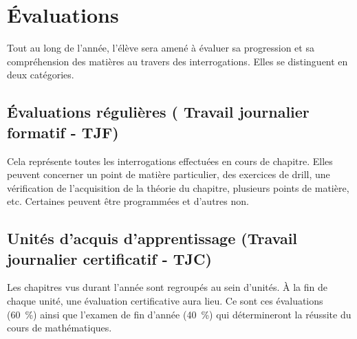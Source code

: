 \documentclass[parskip=half-, numbers=enddot, DIV=15]{scrartcl}
\begin{document}
\section{Évaluations}

Tout au long de l'année, l'élève sera amené à évaluer sa progression et
sa compréhension des matières au travers des interrogations. Elles se
distinguent en deux catégories.

\subsection{Évaluations régulières ( Travail journalier formatif - TJF)}

Cela représente toutes les interrogations effectuées en cours de
chapitre. Elles peuvent concerner un point de matière particulier, des
exercices de drill, une vérification de l'acquisition de la théorie du chapitre, plusieurs points de matière, etc. Certaines peuvent être
programmées et d'autres non.

\subsection{Unités d'acquis d'apprentissage (Travail journalier certificatif - TJC)}

Les chapitres vus durant l'année sont regroupés au sein d'unités. À la fin de chaque unité, une évaluation certificative aura lieu. Ce sont ces évaluations (60~\%) ainsi que l'examen de fin d'année (40~\%) qui détermineront la réussite du cours de mathématiques. 
\end{document}
